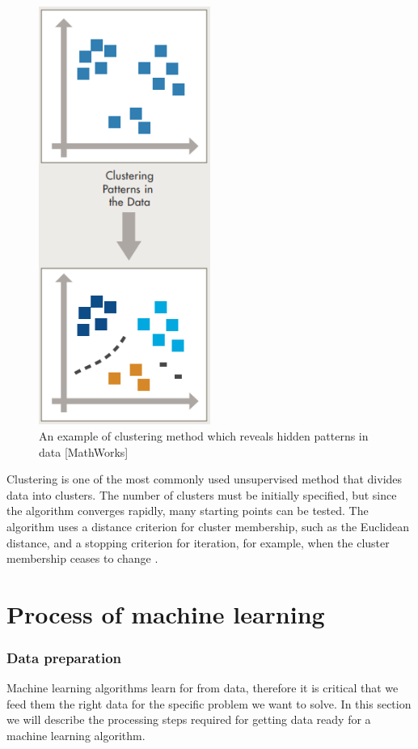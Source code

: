 \begin{figure}[H]
  \centering
    \includegraphics[width=0.5\textwidth]{images/cluster.png}
    \caption{An example of clustering method which reveals hidden patterns in data [MathWorks]}
  \label{datagrowth.png}
\end{figure}

Clustering is one of the most commonly used unsupervised method that divides data into clusters. The number of clusters must be initially specified, but since the algorithm converges rapidly, many starting points can be tested. The algorithm uses a distance
criterion for cluster membership, such as the Euclidean distance, and a stopping criterion for iteration, for example, when the cluster membership ceases to change \citep{ball2010data}.

\section{Process of machine learning}
\label{Process}
\subsubsection{Data preparation}
Machine learning algorithms learn for from data, therefore it is critical that we feed them the right data for the specific problem we want to solve. In this section we will describe the processing steps required for getting data ready for a machine learning algorithm.

